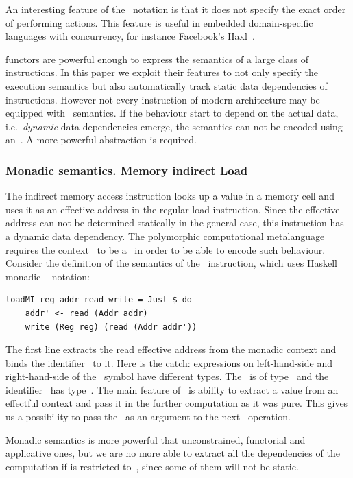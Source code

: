 An interesting feature of the~ notation is that it does not specify the exact order of
performing actions. This feature is useful in embedded domain-specific languages
with concurrency, for instance Facebook's Haxl~\cite{Marlow:2014:NFA:2692915.2628144}.

 functors are powerful enough to express the semantics of a
large class of instructions. In this paper we exploit their features to not only
specify the execution semantics but also automatically track static data dependencies
of instructions. However not every instruction of modern architecture may be
equipped with~ semantics. If the behaviour start to depend on the
actual data, i.e.~\emph{dynamic} data dependencies emerge, the semantics can not
be encoded using an~. A more powerful abstraction is required.

\subsubsection{Monadic semantics. Memory indirect Load}

The indirect memory access instruction looks up a value in a memory cell and uses
it as an effective address in the regular load instruction. Since the effective
address can not be determined statically in the general case, this instruction
has a dynamic data dependency. The polymorphic computational metalanguage requires
the context~ to be a~ in order to be able to encode such behaviour.
Consider the definition of the semantics of the~ instruction, which
uses Haskell monadic ~-notation:

\begin{verbatim}
loadMI reg addr read write = Just $ do
    addr' <- read (Addr addr)
    write (Reg reg) (read (Addr addr'))
\end{verbatim}

The first line extracts the read effective address from the monadic context
and binds the identifier~ to it. Here is the catch: expressions
on left-hand-side and right-hand-side of the~\hs{<-} symbol have different types.
The~ is of type~ and the
identifier~ has type~. The main feature of~
is ability to extract a value from an effectful context and pass it in the further
computation as it was pure. This gives us a possibility to pass the~
as an argument to the next~ operation.

Monadic semantics is more powerful that unconstrained, functorial and applicative ones,
but we are no more able to extract all the dependencies of the computation if
 is restricted to~, since some of them will not be static.